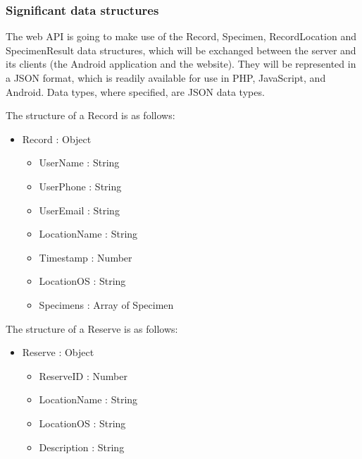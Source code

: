 \begin{itemize}
\begin{itemize}
\begin{itemize}
\begin{itemize}
    \subsubsection{Significant data structures}

        The web API is going to make use of the Record, Specimen, RecordLocation and SpecimenResult data structures, which will be exchanged between the server and its clients (the Android application and the website). They will be represented in a JSON format, which is readily available for use in PHP, JavaScript, and Android. Data types, where specified, are JSON data types. 

        The structure of a Record is as follows:
        \begin{itemize}
            \item Record : Object
            \begin{itemize}
                \item UserName : String
                \item UserPhone : String
                \item UserEmail : String
                \item LocationName : String 
                \item Timestamp : Number 
                \item LocationOS : String
                \item Specimens : Array of Specimen
            \end{itemize}
        \end{itemize}
        
        The structure of a Reserve is as follows:
        \begin{itemize}
        	\item Reserve : Object
        	\begin{itemize}
                \item ReserveID : Number
        		\item LocationName : String 
        		\item LocationOS : String
                \item Description : String
        	\end{itemize}
        \end{itemize}


\end{itemize}
\end{itemize}
\end{itemize}
\end{itemize}
